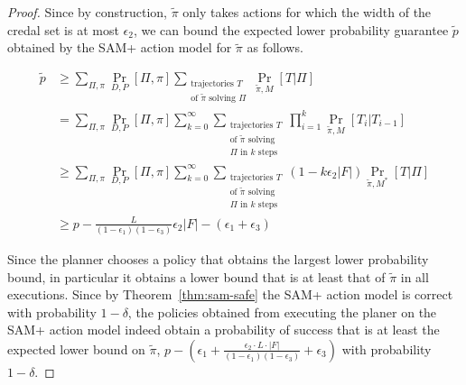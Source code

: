 \documentclass[letterpaper]{article} %
\begin{document}
\begin{proof}
Since by construction, $\tilde{\pi}$ only takes actions for which the width of the credal set is at most $\epsilon_2$, we can bound the expected lower probability guarantee $\tilde{p}$ obtained by the SAM+ action model for $\tilde{\pi}$ as follows.
\begin{small}
\begin{align*}
\tilde{p} &\geq \sum_{\Pi,\pi}\Pr_{D,P}[\Pi,\pi]\sum_{\substack{\text{trajectories }T\\\text{of }\tilde{\pi}\text{ solving }\Pi}}\Pr_{\tilde{\pi},M}[T|\Pi]\\
&=\sum_{\Pi,\pi}\Pr_{D,P}[\Pi,\pi]\sum_{k=0}^\infty\sum_{\substack{\text{trajectories }T\\\text{of }\tilde{\pi}\text{ solving}\\
\Pi\text{ in }k\text{ steps}}}\prod_{i=1}^k\Pr_{\tilde{\pi},M}[T_i|T_{i-1}]\\
&\geq \sum_{\Pi,\pi}\Pr_{D,P}[\Pi,\pi]\sum_{k=0}^\infty\sum_{\substack{\text{trajectories }T\\\text{of }\tilde{\pi}\text{ solving}\\
\Pi\text{ in }k\text{ steps}}}(1-k\epsilon_2|F|)\Pr_{\tilde{\pi},M^*}[T|\Pi]\\
&\geq p-\frac{L}{(1-\epsilon_1)(1-\epsilon_3)}\epsilon_2|F|-(\epsilon_1+\epsilon_3)
\end{align*}
\end{small}

Since the planner chooses a policy that obtains the largest lower probability bound, in particular it obtains a lower bound that is at least that of $\tilde{\pi}$ in all executions. Since by Theorem~\ref{thm:sam-safe} the SAM+ action model is correct with probability $1-\delta$, the policies obtained from executing the planer on the SAM+ action model indeed obtain a probability of success that is at least the expected lower bound on $\tilde{\pi}$, $p-(\epsilon_1+\frac{\epsilon_2\cdot L\cdot |F|}{(1-\epsilon_1)(1-\epsilon_3)}+\epsilon_3)$ with probability $1-\delta$.
\end{proof}
\end{document}
